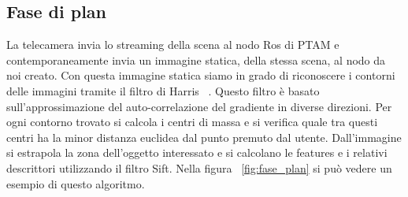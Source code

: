 \subsection{Fase di plan}
La telecamera invia lo streaming della scena al nodo Ros di PTAM e contemporaneamente invia un immagine statica, della stessa scena, al nodo da noi creato. Con questa immagine statica siamo in grado di riconoscere i contorni delle immagini tramite il filtro di Harris ~\cite{Harry}. Questo filtro è basato sull'approssimazione del auto-correlazione del gradiente in diverse direzioni. Per ogni contorno trovato si calcola i centri di massa e si verifica quale tra questi centri ha la minor distanza euclidea dal punto premuto dal utente. Dall'immagine si estrapola la zona dell'oggetto interessato e si calcolano le features e i relativi descrittori utilizzando il filtro Sift. Nella figura ~\ref{fig:fase_plan} si può vedere un esempio di questo algoritmo. 
\begin{figure}
  \centering
\end{figure}
